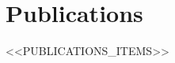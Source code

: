 \section*{Publications}
\resumeSubHeadingListStart
<<PUBLICATIONS_ITEMS>>
\resumeSubHeadingListEnd
\vspace{-0.2cm}
